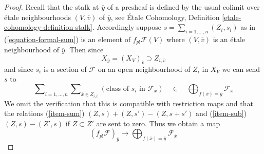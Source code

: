 \begin{proof}
Recall that the stalk at $\overline{y}$ of a presheaf is defined by the
usual colimit over \'etale neighbourhoods $(V, \overline{v})$
of $\overline{y}$, see \'Etale Cohomology, Definition
\ref{etale-cohomology-definition-stalk}. Accordingly
suppose $s = \sum_{i = 1, \ldots, n} (Z_i, s_i)$ as in
(\ref{equation-formal-sum}) is an element of $f_{p!}\mathcal{F}(V)$
where $(V, \overline{v})$ is an \'etale neighbourhood of $\overline{y}$.
Then since
$$
X_{\overline{y}} = (X_V)_{\overline{v}} \supset Z_{i, \overline{v}}
$$
and since $s_i$ is a section of $\mathcal{F}$ on an open neighbourhood
of $Z_i$ in $X_V$ we can send $s$ to
$$
\sum\nolimits_{i = 1, \ldots, n}
\sum\nolimits_{\overline{x} \in Z_{i, \overline{v}}}
\left(\text{class of }s_i\text{ in }\mathcal{F}_{\overline{x}}\right)
\quad\in\quad
\bigoplus\nolimits_{f(\overline{x}) = \overline{y}} \mathcal{F}_{\overline{x}}
$$
We omit the verification that this is compatible with restriction
maps and that the relations (\ref{item-sum}) $(Z, s) + (Z, s') - (Z, s + s')$
and (\ref{item-sub}) $(Z, s) - (Z', s)$ if $Z \subset Z'$ are sent to zero.
Thus we obtain a map
$$
(f_{p!}\mathcal{F})_{\overline{y}}
\longrightarrow
\bigoplus\nolimits_{f(\overline{x}) = \overline{y}} \mathcal{F}_{\overline{x}}
$$


\end{proof}
